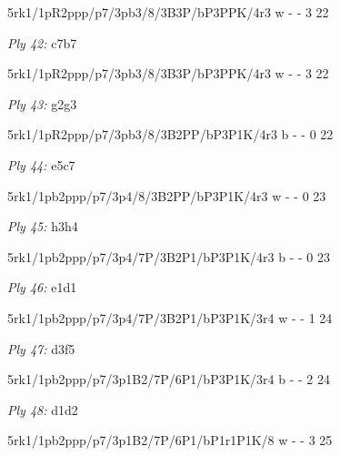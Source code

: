 \documentclass{article}
\begin{document}
5rk1/1pR2ppp/p7/3pb3/8/3B3P/bP3PPK/4r3 w - - 3 22


\showboard

\bigskip

\emph{Ply 42:} c7b7


5rk1/1pR2ppp/p7/3pb3/8/3B3P/bP3PPK/4r3 w - - 3 22


\showboard

\bigskip

\emph{Ply 43:} g2g3


5rk1/1pR2ppp/p7/3pb3/8/3B2PP/bP3P1K/4r3 b - - 0 22


\showboard

\bigskip

\emph{Ply 44:} e5c7

5rk1/1pb2ppp/p7/3p4/8/3B2PP/bP3P1K/4r3 w - - 0 23


\showboard

\bigskip

\emph{Ply 45:} h3h4


5rk1/1pb2ppp/p7/3p4/7P/3B2P1/bP3P1K/4r3 b - - 0 23


\showboard

\bigskip

\emph{Ply 46:} e1d1

5rk1/1pb2ppp/p7/3p4/7P/3B2P1/bP3P1K/3r4 w - - 1 24


\showboard

\bigskip

\emph{Ply 47:} d3f5


5rk1/1pb2ppp/p7/3p1B2/7P/6P1/bP3P1K/3r4 b - - 2 24


\showboard

\bigskip

\emph{Ply 48:} d1d2

5rk1/1pb2ppp/p7/3p1B2/7P/6P1/bP1r1P1K/8 w - - 3 25

\end{document}

